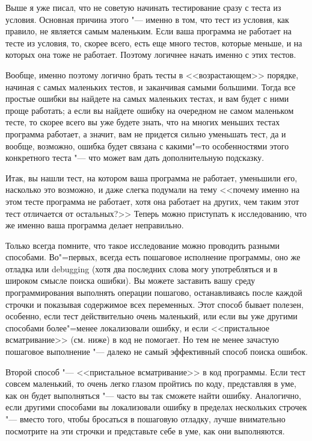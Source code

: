 \documentclass[a4paper,10pt]{problems}
\begin{document}
Выше я уже писал, что не советую начинать тестирование сразу с теста из условия. 
Основная причина этого "--- именно в том, что тест из условия, как правило, не является самым маленьким. 
Если ваша программа не работает на тесте из условия, то, скорее всего, есть еще много тестов, которые меньше, и на которых она тоже не работает.
Поэтому логичнее начать именно с этих тестов.

Вообще, именно поэтому логично брать тесты в <<возрастающем>> порядке, начиная с самых маленьких тестов, и заканчивая самыми большими.
Тогда все простые ошибки вы найдете на самых маленьких тестах, и вам будет с ними проще работать;
а если вы найдете ошибку на очередном не самом маленьком тесте, то скорее всего вы уже будете знать, что на многих меньших тестах программа
работает, а значит, вам не придется сильно уменьшать тест, да и вообще, возможно, ошибка будет связана с какими"=то особенностями этого конкретного теста
"--- что может вам дать дополнительную подсказку.

Итак, вы нашли тест, на котором ваша программа не работает, уменьшили его, насколько это возможно, и даже слегка подумали на тему 
<<почему именно на этом тесте программа не работает, хотя она работает на других, чем таким этот тест отличается от остальных?>> 
Теперь можно приступать к исследованию, что же именно ваша программа делает неправильно.

Только всегда помните, что такое исследование можно проводить разными способами.
Во"=первых, всегда есть пошаговое исполнение программы, оно же отладка или debugging (хотя два последних слова могу употребляться
и в широком смысле поиска ошибки).
Вы можете заставить вашу среду программирования выполнять операции пошагово, останавливаясь после каждой строчки и показывая содержимое всех переменных.
Этот способ бывает полезен, особенно, если тест действительно очень маленький, или если вы уже другими способами более"=менее локализовали ошибку,
и если <<пристальное всматривание>> (см. ниже) в код не помогает. 
Но тем не менее зачастую пошаговое выполнение "--- далеко не самый эффективный способ поиска ошибок.

Второй способ "--- <<пристальное всматривание>> в код программы. 
Если тест совсем маленький, то очень легко глазом пройтись по коду, представляя в уме, как он будет выполняться "--- часто вы так сможете найти ошибку.
Аналогично, если другими способами вы локализовали ошибку в пределах нескольких строчек "--- вместо того, чтобы бросаться в пошаговую отладку,
лучше внимательно посмотрите на эти строчки и представьте себе в уме, как они выполняются.
\end{document}
